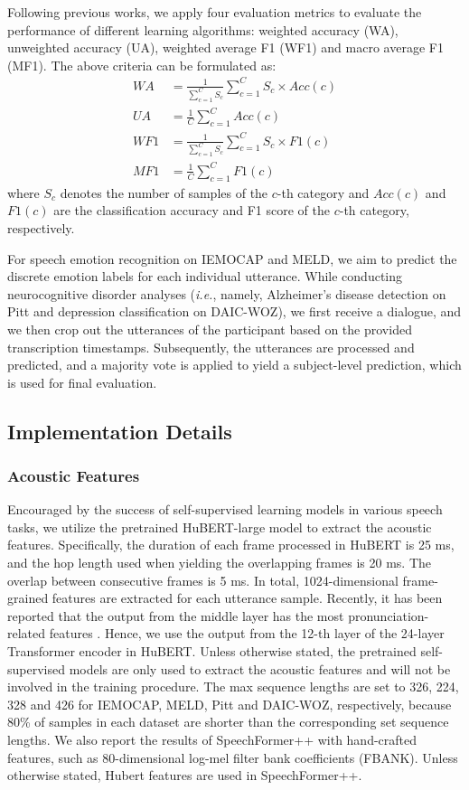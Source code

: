 \documentclass[lettersize,journal]{IEEEtran}
\begin{document}
Following previous works\cite{ctnet, Monica}, we apply four evaluation metrics to evaluate the performance of different learning algorithms: weighted accuracy (WA), unweighted accuracy (UA), weighted average F1 (WF1) and macro average F1 (MF1). The above criteria can be formulated as:
\begin{align}
    WA &= \frac{1}{\sum_{c=1}^CS_c}\sum_{c=1}^C S_c\times Acc(c)\\
    UA &= \frac{1}{C}\sum_{c=1}^C Acc(c)\\
    WF1 &= \frac{1}{\sum_{c=1}^CS_c}\sum_{c=1}^C S_c\times F1(c)\\
    MF1 &= \frac{1}{C}\sum_{c=1}^C F1(c)
    \label{eq23}
\end{align}
where $S_c$ denotes the number of samples of the $c$-th category and $Acc(c)$ and $F1(c)$ are the classification accuracy and F1 score of the $c$-th category, respectively.

For speech emotion recognition on IEMOCAP and MELD, we aim to predict the discrete emotion labels for each individual utterance. While conducting neurocognitive disorder analyses (\textit{i.e.}, namely, Alzheimer's disease detection on Pitt and depression classification on DAIC-WOZ), we first receive a dialogue, and we then crop out the utterances of the participant based on the provided transcription timestamps. Subsequently, the utterances are processed and predicted, and a majority vote is applied to yield a subject-level prediction, which is used for final evaluation.

\subsection{Implementation Details}
\subsubsection{Acoustic Features} Encouraged by the success of self-supervised learning models in various speech tasks, we utilize the pretrained HuBERT-large \cite{hubert} model to extract the acoustic features. Specifically, the duration of each frame processed in HuBERT is 25 ms, and the hop length used when yielding the overlapping frames is 20 ms. The overlap between consecutive frames is 5 ms. In total, 1024-dimensional frame-grained features are extracted for each utterance sample. Recently, it has been reported that the output from the middle layer has the most pronunciation-related features \cite{12layer}. Hence, we use the output from the 12-th layer of the 24-layer Transformer encoder in HuBERT. Unless otherwise stated, the pretrained self-supervised models are only used to extract the acoustic features and will not be involved in the training procedure. The max sequence lengths are set to 326, 224, 328 and 426 for IEMOCAP, MELD, Pitt and DAIC-WOZ, respectively, because 80\% of samples in each dataset are shorter than the corresponding set sequence lengths. We also report the results of SpeechFormer++ with hand-crafted features, such as 80-dimensional log-mel filter bank coefficients (FBANK). Unless otherwise stated, Hubert features are used in SpeechFormer++.
\end{document}
